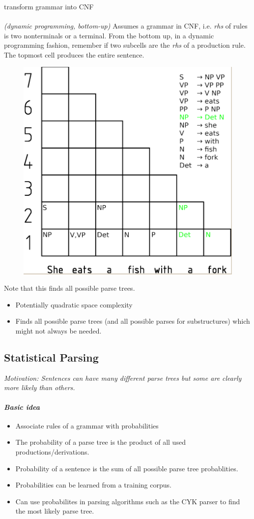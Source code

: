 \documentclass[10pt,twocolumn]{article}
\begin{document}
\todo transform grammar into CNF


\paragraph{ } \textit{(dynamic programming, bottom-up)} Assumes
a grammar in CNF, i.e. \textit{rhs} of rules is two nonterminals or a terminal.
From the bottom up, in a dynamic programming fashion, remember if two subcells
are the \textit{rhs} of a production rule. The topmost cell produces the entire sentence.
\begin{figure}
  \centering
  \includegraphics[width=0.4\linewidth]{cyk-parsing}
\end{figure}
Note that this finds all possible parse trees.
\begin{itemize}
\item Potentially quadratic space complexity
\item Finds all possible parse trees (and all possible parses for substructures)
  which might not always be needed.
\end{itemize}


\subsection{Statistical Parsing}

\textit{Motivation: Sentences can have many different parse trees but some are
  clearly more likely than others.}

\paragraph{\textit{Basic idea}}
\begin{itemize}
\item Associate rules of a grammar with probabilities
\item The probability of a parse tree is the product of all used
  productions/derivations.
\item Probability of a sentence is the sum of all possible parse tree
  probablities.
\item Probabilities can be learned from a training corpus.
\item Can use probabilites in parsing algorithms such as the CYK parser to find
  the most likely parse tree.
\end{itemize}
\end{document}
